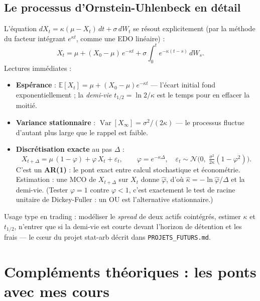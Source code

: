 \documentclass[11pt,a4paper]{article}
\newcommand{\code}[1]{\texttt{#1}}
\begin{document}
\subsection{Le processus d'Ornstein-Uhlenbeck en détail}
\label{app:ou}

L'équation $dX_t = \kappa(\mu - X_t)\,dt + \sigma\,dW_t$ se résout explicitement (par
la méthode du facteur intégrant $e^{\kappa t}$, comme une EDO linéaire) :
\[
X_t = \mu + (X_0 - \mu)\,e^{-\kappa t} + \sigma \int_0^t e^{-\kappa (t-s)}\, dW_s .
\]
Lectures immédiates :
\begin{itemize}[itemsep=2pt]
  \item \textbf{Espérance} : $\mathbb{E}[X_t] = \mu + (X_0 - \mu) e^{-\kappa t}$ ---
        l'écart initial fond exponentiellement ; la \emph{demi-vie} $t_{1/2} = \ln 2 /
        \kappa$ est le temps pour en effacer la moitié.
  \item \textbf{Variance stationnaire} : $\operatorname{Var}[X_\infty] =
        \sigma^2 / (2\kappa)$ --- le processus fluctue d'autant plus large que le rappel
        est faible.
  \item \textbf{Discrétisation exacte} au pas $\Delta$ :
        \[
        X_{t+\Delta} = \mu\,(1 - \varphi) + \varphi\, X_t + \varepsilon_t,
        \qquad \varphi = e^{-\kappa \Delta},
        \quad \varepsilon_t \sim \mathcal{N}\!\Big(0,\; \tfrac{\sigma^2}{2\kappa}(1 - \varphi^2)\Big).
        \]
        C'est un \textbf{AR(1)} : le pont exact entre calcul stochastique et
        économétrie. Estimation : une MCO de $X_{t+\Delta}$ sur $X_t$ donne
        $\hat\varphi$, d'où $\hat\kappa = -\ln \hat\varphi / \Delta$ et la demi-vie.
        (Tester $\varphi = 1$ contre $\varphi < 1$, c'est exactement le test de racine
        unitaire de Dickey-Fuller : un OU est l'alternative stationnaire.)
\end{itemize}
Usage type en trading : modéliser le \emph{spread} de deux actifs cointégrés, estimer
$\kappa$ et $t_{1/2}$, n'entrer que si la demi-vie est courte devant l'horizon de
détention et les frais --- le c\oe ur du projet stat-arb décrit dans
\code{PROJETS\_FUTURS.md}.

\section{Compléments théoriques : les ponts avec mes cours}
\label{app:theorie}
\end{document}
